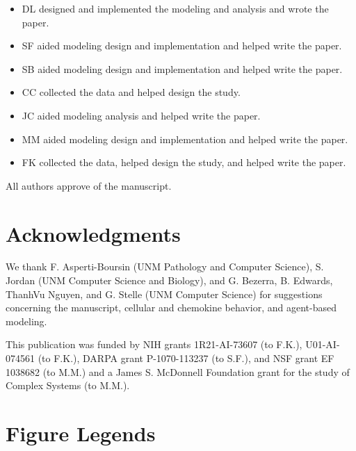 \documentclass[10pt]{article}
\begin{document}
\begin{itemize}
\item DL designed and implemented the modeling and analysis and wrote the paper.
\item SF aided modeling design and implementation and helped write the paper.
\item SB aided modeling design and implementation and helped write the paper.
\item CC collected the data and helped design the study.
\item JC aided  modeling analysis and helped write the paper.
\item MM aided modeling design and implementation and helped write the paper.
\item FK collected the data, helped design the study, and helped write the paper.
\end{itemize}

All authors approve of the manuscript.


\section*{Acknowledgments}

We thank F. Asperti-Boursin (UNM Pathology and Computer Science), S. Jordan (UNM Computer Science and Biology), and G. Bezerra, B. Edwards, ThanhVu Nguyen, and G. Stelle (UNM Computer Science) for suggestions concerning the manuscript, cellular and chemokine behavior, and agent-based modeling.

This publication was funded by NIH grants 1R21-AI-73607 (to F.K.), U01-AI-074561 (to F.K.), DARPA grant P-1070-113237 (to S.F.), and NSF grant EF 1038682 (to M.M.) and a James S. McDonnell Foundation grant for the study of Complex Systems (to M.M.).





\pagebreak

\section*{Figure Legends}
\end{document}
